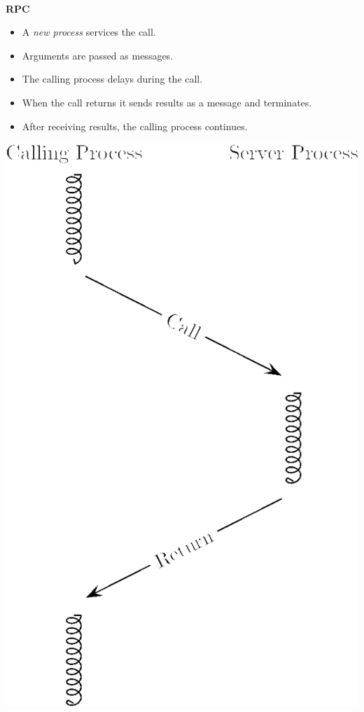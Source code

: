 \documentclass{article}
\newcommand{\bi}{\begin{itemize}}
\newcommand{\ii}{\item}
\newcommand{\ei}{\end{itemize}}
\newcommand{\ti}[1]{
\newpage
\mbox{~}

\vspace{1.25in}
\centerline{\bf #1}
}
\begin{document}
\ti{RPC}
\begin{multicols}{2}
\bi
\ii A {\em new process} services the call.
\ii Arguments are passed as messages.
\ii The calling process delays during the call.
\ii When the call returns it sends results as a message and
terminates.
\ii After receiving results, the calling process continues.
\ei
\vfill
\columnbreak
\hfill
\includegraphics[scale=0.4]{figures/rpc.png}
\end{multicols}
\end{document}
